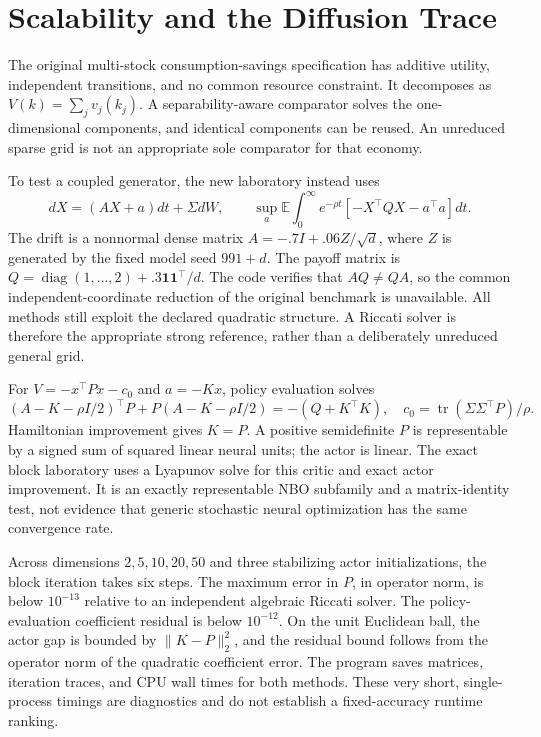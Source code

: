 \documentclass[ecta,draft]{econsocart}
\theoremstyle{definition}
\theoremstyle{remark}
\newcommand{\E}{\mathbb E}
\newcommand{\tr}{\operatorname{tr}}
\begin{document}
\section{Scalability and the Diffusion Trace}\label{sec:scaling}
The original multi-stock consumption-savings specification has additive utility, independent transitions, and no common resource constraint. It decomposes as $V(k)=\sum_jv_j(k_j)$. A separability-aware comparator solves the one-dimensional components, and identical components can be reused. An unreduced sparse grid is not an appropriate sole comparator for that economy.

To test a coupled generator, the new laboratory instead uses
\begin{equation}\label{eq:lq}
 dX=(AX+a)dt+\Sigma dW,\qquad
 \sup_a\E\int_0^\infty e^{-\rho t}[-X^\top QX-a^\top a]dt.
\end{equation}
The drift is a nonnormal dense matrix $A=-.7I+.06Z/\sqrt d$, where $Z$ is generated by the fixed model seed $991+d$. The payoff matrix is $Q=\operatorname{diag}(1,\ldots,2)+.3\bm1\bm1^\top/d$. The code verifies that $AQ\ne QA$, so the common independent-coordinate reduction of the original benchmark is unavailable. All methods still exploit the declared quadratic structure. A Riccati solver is therefore the appropriate strong reference, rather than a deliberately unreduced general grid.

For $V=-x^\top Px-c_0$ and $a=-Kx$, policy evaluation solves
\begin{equation}\label{eq:lyapunov}
 (A-K-\rho I/2)^\top P+P(A-K-\rho I/2)=-(Q+K^\top K),
 \quad c_0=\tr(\Sigma\Sigma^\top P)/\rho.
\end{equation}
Hamiltonian improvement gives $K=P$. A positive semidefinite $P$ is representable by a signed sum of squared linear neural units; the actor is linear. The exact block laboratory uses a Lyapunov solve for this critic and exact actor improvement. It is an exactly representable NBO subfamily and a matrix-identity test, not evidence that generic stochastic neural optimization has the same convergence rate.

Across dimensions $2,5,10,20,50$ and three stabilizing actor initializations, the block iteration takes six steps. The maximum error in $P$, in operator norm, is below $10^{-13}$ relative to an independent algebraic Riccati solver. The policy-evaluation coefficient residual is below $10^{-12}$. On the unit Euclidean ball, the actor gap is bounded by $\|K-P\|_2^2$, and the residual bound follows from the operator norm of the quadratic coefficient error. The program saves matrices, iteration traces, and CPU wall times for both methods. These very short, single-process timings are diagnostics and do not establish a fixed-accuracy runtime ranking.
\end{document}
